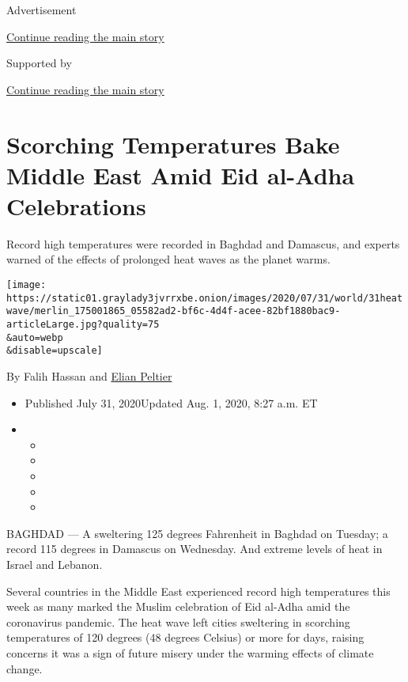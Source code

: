 Advertisement

\protect\hyperlink{after-top}{Continue reading the main story}

Supported by

\protect\hyperlink{after-sponsor}{Continue reading the main story}

\hypertarget{scorching-temperatures-bake-middle-east-amid-eid-al-adha-celebrations}{%
\section{Scorching Temperatures Bake Middle East Amid Eid al-Adha
Celebrations}\label{scorching-temperatures-bake-middle-east-amid-eid-al-adha-celebrations}}

Record high temperatures were recorded in Baghdad and Damascus, and
experts warned of the effects of prolonged heat waves as the planet
warms.

\texttt{[image: https://static01.graylady3jvrrxbe.onion/images/2020/07/31/world/31heatwave/merlin\_175001865\_05582ad2-bf6c-4d4f-acee-82bf1880bac9-articleLarge.jpg?quality=75\\\&auto=webp\\\&disable=upscale]}

By Falih Hassan and
\href{https://www.nytimes3xbfgragh.onion/by/elian-peltier}{Elian
Peltier}

\begin{itemize}
\item
  Published July 31, 2020Updated Aug. 1, 2020, 8:27 a.m. ET
\item
  \begin{itemize}
  \item
  \item
  \item
  \item
  \item
  \end{itemize}
\end{itemize}

BAGHDAD --- A sweltering 125 degrees Fahrenheit in Baghdad on Tuesday; a
record 115 degrees in Damascus on Wednesday. And extreme levels of heat
in Israel and Lebanon.

Several countries in the Middle East experienced record high
temperatures this week as many marked the Muslim celebration of Eid
al-Adha amid the coronavirus pandemic. The heat wave left cities
sweltering in scorching temperatures of 120 degrees (48 degrees Celsius)
or more for days, raising concerns it was a sign of future misery under
the warming effects of climate change.

